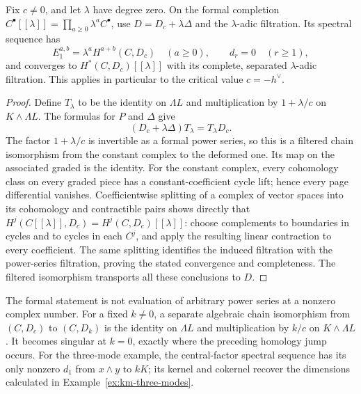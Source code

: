 \begin{corollary}\label{cor:critical-level-spectral}
Fix $c\ne0$, and let $\lambda$ have degree zero.
On the formal completion $C^\bullet[[\lambda]]=\prod_{a\ge0}\lambda^aC^\bullet$,
use $D=D_c+\lambda\Delta$ and the $\lambda$-adic filtration.
Its spectral sequence has
\[
E_1^{a,b}=\lambda^aH^{a+b}(C,D_c)\quad(a\ge0),\qquad d_r=0\quad(r\ge1),
\]
and converges to $H^*(C,D_c)[[\lambda]]$ with its complete, separated
$\lambda$-adic filtration.  This applies in particular to the critical value
$c=-h^\vee$.
\end{corollary}
\begin{proof}
Define $T_\lambda$ to be the identity on $\Lambda L$ and multiplication by
$1+\lambda/c$ on $K\wedge\Lambda L$.
The formulas for $P$ and $\Delta$ give
\[
(D_c+\lambda\Delta)T_\lambda=T_\lambda D_c.
\]
The factor $1+\lambda/c$ is invertible as a formal power series, so this is
a filtered chain isomorphism from the constant complex to the deformed one.
Its map on the associated graded is the identity.
For the constant complex, every cohomology class on every graded piece has
a constant-coefficient cycle lift; hence every page differential vanishes.
Coefficientwise splitting of a complex of vector spaces into its cohomology
and contractible pairs shows directly that
$H^j(C[[\lambda]],D_c)=H^j(C,D_c)[[\lambda]]$:
choose complements to boundaries in cycles and to cycles in each $C^j$,
and apply the resulting linear contraction to every coefficient.
The same splitting identifies the induced filtration with the power-series
filtration, proving the stated convergence and completeness.
The filtered isomorphism transports all these conclusions to $D$.
\end{proof}

The formal statement is not evaluation of arbitrary power series at a
nonzero complex number.  For a fixed $k\ne0$, a separate algebraic chain
isomorphism from $(C,D_c)$ to $(C,D_k)$ is the identity on $\Lambda L$ and
multiplication by $k/c$ on $K\wedge\Lambda L$.
It becomes singular at $k=0$, exactly where the preceding homology jump occurs.
For the three-mode example, the central-factor spectral sequence has its
only nonzero $d_1$ from $x\wedge y$ to $kK$; its kernel and cokernel recover
the dimensions calculated in Example~\ref{ex:km-three-modes}.

